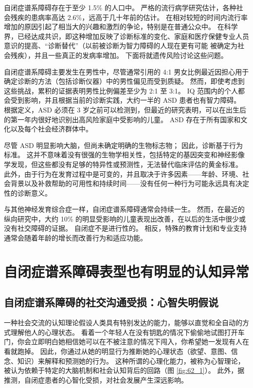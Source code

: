 自闭症谱系障碍存在于至少 1.5\% 的人口中。
严格的流行病学研究估计，各种社会残疾的患病率高达 2.6\%，远高于几十年前的估计。
在相对较短的时间内流行率增加的原因引起了相当大的兴趣和激烈的争论，特别是在普通公众中。
在科学界，已经达成共识，即这种增加反映了诊断标准的变化、家庭和医疗保健专业人员意识的提高、“诊断替代”（以前被诊断为智力障碍的人现在更有可能 被确定为社会残疾），并且一些真正的发病率增加。
下面将就遗传风险讨论这些问题。


自闭症谱系障碍主要发生在男性中，尽管通常引用的 4:1 男女比例最近因担心用于确定诊断的方法（包括诊断仪器）中的男性偏见而受到质疑。
然而，即使考虑到这些挑战，累积的证据表明男性比例偏差至少为 2:1 至 3:1。
IQ 范围内的个人都会受到影响，并且根据当前的诊断实践，大约一半的 ASD 患者也有智力障碍。
根据定义，ASD 必须在 3 岁之前可以检测到，但最近的研究表明，可以在出生后的第一年内很好地识别出高风险家庭中受影响的儿童。
ASD 存在于所有国家和文化以及每个社会经济群体中。


尽管 ASD 明显影响大脑，但尚未确定明确的生物标志物；
因此，诊断基于行为标准。
这并不意味着没有很强的生物学相关性，包括特定的基因突变和神经影像学发现，但这些都没有足够的特异性或预测性，无法替代临床评估的黄金标准。
此外，由于行为在发育过程中是可变的，并且取决于许多因素——年龄、环境、社会背景以及补救帮助的可用性和持续时间——没有任何一种行为可能永远具有决定性的诊断意义。


与其他神经发育综合症一样，自闭症谱系障碍通常会持续一生。
然而，在最近的纵向研究中，大约 10\% 的明显受影响的儿童表现出改善，在以后的生活中很少或没有社交障碍的证据。
自闭症不是进行性的。
相反，特殊的教育计划和专业支持通常会随着年龄的增长而改善行为和适应功能。



\section{自闭症谱系障碍表型也有明显的认知异常}

\subsection{自闭症谱系障碍的社交沟通受损：心智失明假说}

一种社会交流的认知理论假设人类具有特别发达的能力，能够以直觉和全自动的方式理解他人的心理状态。
看着一个年轻人在没有钥匙的情况下偷偷地试图打开车门，你会立即明白她相信她可以在不被注意的情况下闯入，你希望她一发现有人在看就跑掉。
因此，你通过从她的明显行为推断她的心理状态（欲望、意图、信念、知识）来解释和预测她的行为。
这种所谓的心理化能力，被称为心智理论，被认为依赖于特定的大脑机制和社会认知背后的回路（图 \ref{fig:62_1}）。
此外，据推测，自闭症患者的心智化受损，对社会发展产生深远影响。


